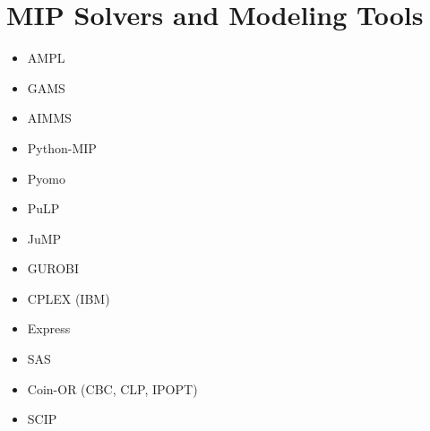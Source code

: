 
%
%


\section{MIP Solvers and Modeling Tools}

\begin{itemize}
\item AMPL
\item GAMS
\item AIMMS
\item Python-MIP
\item Pyomo
\item PuLP
\item JuMP
\end{itemize}

\begin{itemize}
\item GUROBI
\item CPLEX (IBM)
\item Express
\item SAS
\item Coin-OR (CBC, CLP, IPOPT)
\item SCIP
\end{itemize}









%
